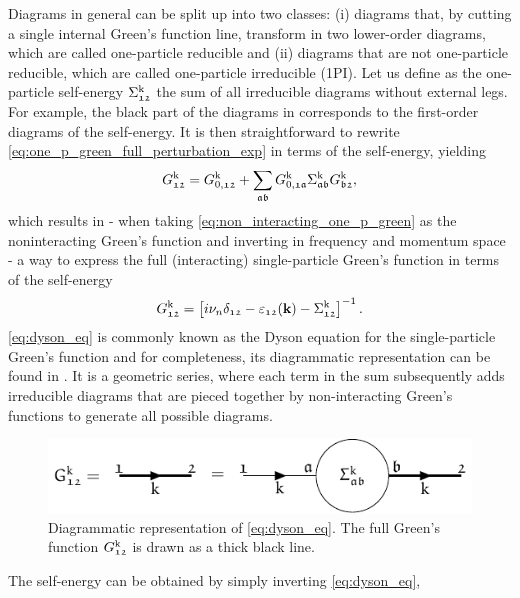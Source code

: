 \documentclass[../../main.tex]{subfiles}
\begin{document}
Diagrams in general can be split up into two classes: (i) diagrams that, by cutting a single internal Green's function line, transform in two lower-order diagrams, which are called one-particle reducible and (ii) diagrams that are not one-particle reducible, which are called one-particle irreducible (1PI). Let us define as the one-particle self-energy $\Sigma_{\mathfrak{12}}^{\text{k}}$ the sum of all irreducible diagrams without external legs. For example, the black part of the diagrams in  corresponds to the first-order diagrams of the self-energy. It is then straightforward to rewrite \eqref{eq:one_p_green_full_perturbation_exp} in terms of the self-energy, yielding
\begin{align}\label{eq:dyson_eq}
	G_{\mathfrak{12}}^{\text{k}}=G_{0,\mathfrak{12}}^{\text{k}}+\sum_{\mathfrak{ab}}G_{0,\mathfrak{1a}}^{\text{k}}\Sigma_{\mathfrak{ab}}^{\text{k}}G_{\mathfrak{b2}}^{\text{k}},
\end{align}
which results in - when taking \eqref{eq:non_interacting_one_p_green} as the noninteracting Green's function and inverting in frequency and momentum space - a way to express the full (interacting) single-particle Green's function in terms of the self-energy
\begin{align}
	G_{\mathfrak{12}}^{\text{k}} = \left [i\nu_n\delta_{\mathfrak{12}}-\varepsilon_{\mathfrak{12}}(\textbf{k})-\Sigma_{\mathfrak{12}}^{\text{k}}\right ]^{-1}.
\end{align}
\eqref{eq:dyson_eq} is commonly known as the Dyson equation \cite{dyson eq} for the single-particle Green's function and for completeness, its diagrammatic representation can be found in . It is a geometric series, where each term in the sum subsequently adds irreducible diagrams that are pieced together by non-interacting Green's functions to generate all possible diagrams.
\begin{figure}[ht!]
	\centering
	\includegraphics[scale=1.2]{../../Graphics/Diagrams/dyson_eq/dyson_eq}
	\caption{Diagrammatic representation of \eqref{eq:dyson_eq}. The full Green's function $G_{\mathfrak{12}}^{\text{k}}$ is drawn as a thick black line.}
	\label{fig:dyson_eq}
\end{figure}
The self-energy can be obtained by simply inverting \eqref{eq:dyson_eq},
\end{document}

